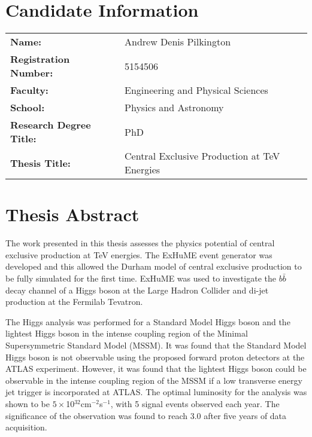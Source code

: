 \documentclass[12pt]{article}
\begin{document}

\section*{Candidate Information}


\begin{table}[h]
\begin{tabular}{l l }
\textbf{Name:} & Andrew Denis Pilkington \\
\textbf{Registration Number:} & 5154506 \\
\textbf{Faculty:} & Engineering and Physical Sciences \\
\textbf{School:} & Physics and Astronomy \\
\textbf{Research Degree Title:} & PhD \\
\textbf{Thesis Title:} & Central Exclusive Production at TeV Energies\\
\end{tabular}
\label{default}
\end{table}%


\section*{Thesis Abstract}

The work presented in this thesis assesses the physics potential of central exclusive production at TeV energies. 
The ExHuME event generator was developed and this allowed the Durham model of central exclusive production to be fully simulated for the first time. ExHuME was used to investigate the $b\bar{b}$ decay channel of a Higgs boson at the Large Hadron Collider and di-jet production at the Fermilab Tevatron.

The Higgs analysis was performed for a Standard Model Higgs boson and the lightest Higgs boson in the intense coupling region of the Minimal Supersymmetric Standard Model (MSSM).
It was found that the Standard Model Higgs boson is not observable using the proposed forward proton detectors at the ATLAS experiment. However, it was found that the lightest Higgs boson could be observable in the intense coupling region of the MSSM 
if a low transverse energy jet trigger is incorporated at ATLAS. The optimal luminosity for the analysis was shown to be $5\times$10$^{32}$cm$^{-2}$s$^{-1}$, with 5 signal events observed each year. The significance of the observation was found to reach 3.0 after five years of data acquisition. 
\end{document}
